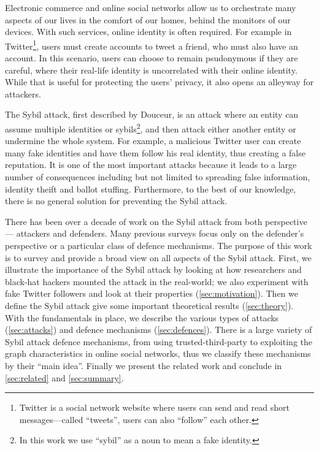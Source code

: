 Electronic commerce and online social networks allow us to orchestrate many
aspects of our lives in the comfort of our homes, behind the monitors of our
devices. With such services, online identity is often required. For example in
Twitter\footnote{Twitter is a social network website where users can send and
  read short messages---called ``tweets'', users can also ``follow'' each
  other.}, users must create accounts to tweet a friend, who must also have an
account. In this scenario, users can choose to remain psudonymous if they are
careful, where their real-life identity is uncorrelated with their online
identity. While that is useful for protecting the users' privacy, it also opens
an alleyway for attackers.

The Sybil attack, first described by Douceur\cite{douceur2002sybil}, is an
attack where an entity can assume multiple identities or sybils\footnote{In this
  work we use ``sybil'' as a noun to mean a fake identity.}, and then attack
either another entity or undermine the whole system. For example, a malicious
Twitter user can create many fake identities and have them follow his real
identity, thus creating a false reputation. It is one of the most important
attacks because it leads to a large number of consequences including but not
limited to spreading false information, identity theift\cite{bilge2009all} and
ballot stuffing\cite{bhattacharjee2005avoiding}. Furthermore, to the best of our
knowledge, there is no general solution for preventing the Sybil attack.

There has been over a decade of work on the Sybil attack from both perspective
--- attackers and defenders. Many previous surveys focus only on the defender's
perspective or a particular class of defence mechanisms. The purpose of this
work is to survey and provide a broad view on all aspects of the Sybil attack.
First, we illustrate the importance of the Sybil attack by looking at how
researchers and black-hat hackers mounted the attack in the real-world; we also
experiment with fake Twitter followers and look at their properties
(\autoref{sec:motivation}). Then we define the Sybil attack give some important
theoretical results (\autoref{sec:theory}). With the fundamentals in place, we
describe the various types of attacks (\autoref{sec:attacks}) and defence
mechanisms (\autoref{sec:defences}). There is a large variety of Sybil attack
defence mechanisms, from using trusted-third-party to exploiting the graph
characteristics in online social networks, thus we classify these mechanisms by
their ``main idea''. Finally we present the related work and conclude in
\autoref{sec:related} and \autoref{sec:summary}.

